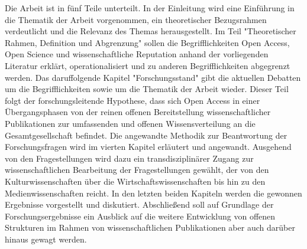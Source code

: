 Die Arbeit ist in fünf Teile unterteilt. In der Einleitung wird eine Einführung in die Thematik der Arbeit vorgenommen, ein theoretischer Bezugsrahmen verdeutlicht und die Relevanz des Themas herausgestellt. Im Teil "Theoretischer Rahmen, Definition und Abgrenzung" sollen die Begrifflichkeiten Open Access, Open Science und wissenschaftliche Reputation anhand der vorliegenden Literatur erklärt, operationalisiert und zu anderen Begrifflichkeiten abgegrenzt werden. Das daruffolgende Kapitel "Forschungsstand" gibt die aktuellen Debatten um die Begrifflichkeiten sowie um die Thematik der Arbeit wieder. Dieser Teil folgt der forschungsleitende Hypothese, dass sich Open Access in einer Übergangsphasen von der reinen offenen Bereitstellung wissenschaftlicher Publikationen zur umfassenden und offenen Wissensverteilung an die Gesamtgesellschaft befindet. Die angewandte Methodik zur Beantwortung der Forschungsfragen wird im vierten Kapitel erläutert und angewandt. Ausgehend von den Fragestellungen wird dazu ein transdisziplinärer Zugang zur wissenschaftlichen Bearbeitung der Fragestellungen gewählt, der von den Kulturwissenschaften über die Wirtschaftswissenschaften bis hin zu den Medienwissenschaften reicht. In den letzten beiden Kapiteln werden die gewonnen Ergebnisse vorgestellt und diskutiert. Abschließend soll auf Grundlage der Forschungsergebnisse ein Ausblick auf die weitere Entwicklung von offenen Strukturen im Rahmen von wissenschaftlichen Publikationen aber auch darüber hinaus gewagt werden.

